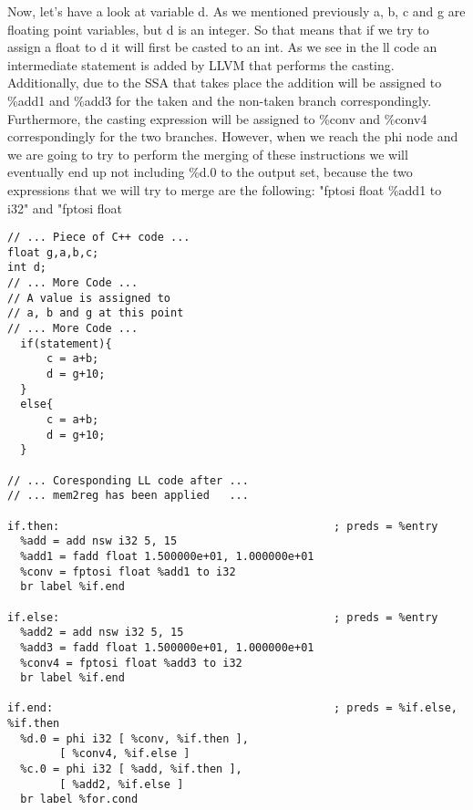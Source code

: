 Now, let's have a look at variable d. As we mentioned previously a, b, c and g are floating point variables, but d is an integer. So that means that if we try to assign a float to d it will first be casted to an int. As we see in the ll code an intermediate statement is added by LLVM that performs the casting. Additionally, due to the SSA that takes place the addition will be assigned to \%add1 and \%add3 for the taken and the non-taken branch correspondingly. Furthermore, the casting expression will be assigned to \%conv and \%conv4 correspondingly for the two branches. However, when we reach the phi node and we are going to try to perform the merging of these instructions we will eventually end up not including \%d.0 to the output set, because the two expressions that we will try to merge are the following: "fptosi float \%add1 to i32" and "fptosi float %


\begin{lstlisting}[caption=Merging in Available Expression Analysis preview, label=mAEA]
// ... Piece of C++ code ...
float g,a,b,c;
int d;
// ... More Code ...
// A value is assigned to
// a, b and g at this point
// ... More Code ...
  if(statement){
	  c = a+b;
	  d = g+10;
  }
  else{
	  c = a+b;
	  d = g+10;
  }

// ... Coresponding LL code after ...
// ... mem2reg has been applied   ...

if.then:                                          ; preds = %entry
  %add = add nsw i32 5, 15
  %add1 = fadd float 1.500000e+01, 1.000000e+01
  %conv = fptosi float %add1 to i32
  br label %if.end

if.else:                                          ; preds = %entry
  %add2 = add nsw i32 5, 15
  %add3 = fadd float 1.500000e+01, 1.000000e+01
  %conv4 = fptosi float %add3 to i32
  br label %if.end

if.end:                                           ; preds = %if.else, %if.then
  %d.0 = phi i32 [ %conv, %if.then ], 
        [ %conv4, %if.else ]
  %c.0 = phi i32 [ %add, %if.then ], 
        [ %add2, %if.else ]
  br label %for.cond
  
\end{lstlisting}
